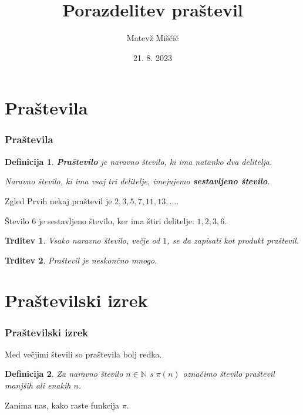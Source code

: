 \documentclass{beamer}
\newtheorem{definicija}{Definicija}
\newtheorem{trditev}{Trditev}
\def\N{\mathbb{N}}
\begin{document}

\title{Porazdelitev praštevil}
\author{Matevž Miščič}
\date{21. 8. 2023}
\begin{frame}
   \titlepage
\end{frame}


\section{Praštevila}
\begin{frame}
    \frametitle{Praštevila}
    \begin{definicija}
        \textbf{Praštevilo} je naravno število, ki ima natanko dva delitelja.

        Naravno število, ki ima vsaj tri delitelje, imejujemo \textbf{sestavljeno število}.
    \end{definicija}
    \pause
    \medskip
    \begin{exampleblock}{Zgled}
        Prvih nekaj praštevil je $2, 3, 5, 7, 11, 13, \ldots$.

        Število $6$ je sestavljeno število, ker ima štiri delitelje: $1, 2, 3, 6$.
    \end{exampleblock}
 \end{frame}


\begin{frame}
    \begin{trditev}
        Vsako naravno število, večje od $1$, se da zapisati kot produkt praštevil.
    \end{trditev}
    \bigskip
    \pause
    \begin{trditev}
        Praštevil je neskončno mnogo.
    \end{trditev}
\end{frame}


\section{Praštevilski izrek}
\begin{frame}
    \frametitle{Praštevilski izrek}
    Med večjimi števili so praštevila bolj redka.
    \medskip
    \begin{definicija}
        Za naravno število $n \in \N$ s \textbf{$\pi(n)$} označimo število praštevil manjših ali enakih $n$.
    \end{definicija}
    \medskip
    Zanima nas, kako raste funkcija $\pi$.
\end{frame}
\end{document}
